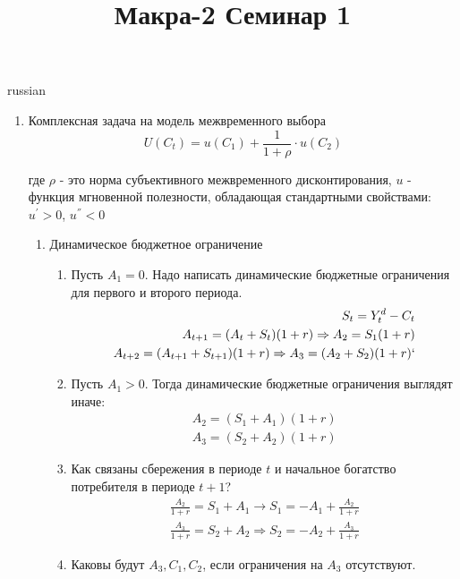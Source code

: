 \documentclass{article}
\begin{document}
\title{\foreignlanguage{russian}{Макра-2 Семинар 1}}
\maketitle
\begin{otherlanguage*}{russian}
\begin{enumerate}
\item Комплексная задача на модель межвременного выбора 
\begin{equation}
U(C_t) = u(C_1) + \frac{1}{1 + \rho} \cdot u(C_2)
\end{equation}

где $ \rho $ - это норма субъективного межвременного дисконтирования, $ u $ - функция мгновенной полезности, обладающая стандартными свойствами: $ u^{'} > 0$, $ u^{''} < 0 $
\begin{enumerate}

\item Динамическое бюджетное ограничение

\begin{enumerate}
\item Пусть $ A_1 = 0$. Надо написать динамические бюджетные ограничения для первого и второго периода. 
\begin{align}
S_t = Y^d_t - C_t \\
A_{t+1} = (A_t + S_t) ( 1 + r) \Rightarrow A_2 = S_1 (1 + r)\\
A_{t+2} = (A_{t+1} + S_{t+1}) (1 +r) \Rightarrow A_3 = (A_2 + S_2) (1 + r) ` 
\end{align}  

\item Пусть $ A_1 > 0 $. Тогда динамические бюджетные ограничения выглядят иначе:
\begin{align}
A_2 = (S_1 + A_1) (1 + r) \\
A_3 = (S_2 + A_2) (1 + r) 
\end{align}

\item Как связаны сбережения в периоде $ t $ и начальное богатство потребителя в периоде $ t + 1 $? 
\begin{align}
\frac{A_2}{1 + r} = S_1 +A_1 \rightarrow S_1 = - A_1 + \frac{A_2}{1 + r}\\
\frac{A_3}{1 + r} = S_2 + A_2 \Rightarrow S_2 = - A_2 + \frac{A_3}{1 + r}
\end{align}

\item Каковы будут $ A_3, C_1, C_2 $, если ограничения на $ A_3 $ отсутствуют. 


\end{enumerate}
\end{enumerate}
\end{enumerate}
\end{otherlanguage*}
\end{document}
